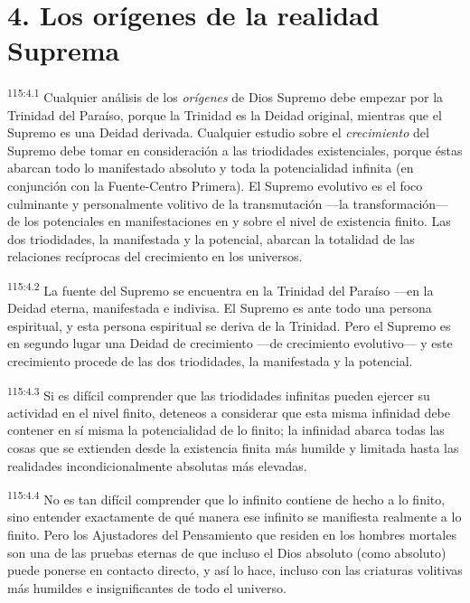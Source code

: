 \documentclass[twoside, 11pt]{book}
\begin{document}
\section*{4. Los orígenes de la realidad Suprema}
\par
\textsuperscript{115:4.1} Cualquier análisis de los \textit{orígenes} de Dios Supremo debe empezar por la Trinidad del Paraíso, porque la Trinidad es la Deidad original, mientras que el Supremo es una Deidad derivada. Cualquier estudio sobre el \textit{crecimiento} del Supremo debe tomar en consideración a las triodidades existenciales, porque éstas abarcan todo lo manifestado absoluto y toda la potencialidad infinita (en conjunción con la Fuente-Centro Primera). El Supremo evolutivo es el foco culminante y personalmente volitivo de la transmutación ---la transformación--- de los potenciales en manifestaciones en y sobre el nivel de existencia finito. Las dos triodidades, la manifestada y la potencial, abarcan la totalidad de las relaciones recíprocas del crecimiento en los universos.

\par
\textsuperscript{115:4.2} La fuente del Supremo se encuentra en la Trinidad del Paraíso ---en la Deidad eterna, manifestada e indivisa. El Supremo es ante todo una persona espiritual, y esta persona espiritual se deriva de la Trinidad. Pero el Supremo es en segundo lugar una Deidad de crecimiento ---de crecimiento evolutivo--- y este crecimiento procede de las dos triodidades, la manifestada y la potencial.

\par
\textsuperscript{115:4.3} Si es difícil comprender que las triodidades infinitas pueden ejercer su actividad en el nivel finito, deteneos a considerar que esta misma infinidad debe contener en sí misma la potencialidad de lo finito; la infinidad abarca todas las cosas que se extienden desde la existencia finita más humilde y limitada hasta las realidades incondicionalmente absolutas más elevadas.

\par
\textsuperscript{115:4.4} No es tan difícil comprender que lo infinito contiene de hecho a lo finito, sino entender exactamente de qué manera ese infinito se manifiesta realmente a lo finito. Pero los Ajustadores del Pensamiento que residen en los hombres mortales son una de las pruebas eternas de que incluso el Dios absoluto (como absoluto) puede ponerse en contacto directo, y así lo hace, incluso con las criaturas volitivas más humildes e insignificantes de todo el universo.
\end{document}

